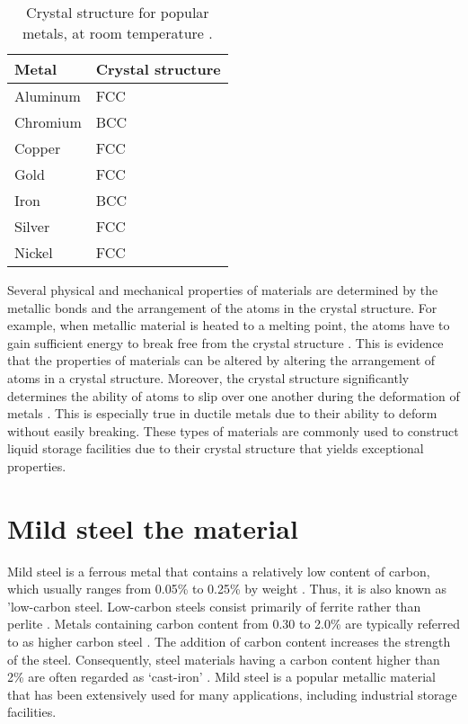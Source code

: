 \begin{table}[H]
\caption{Crystal structure for popular metals, at room temperature \cite{hench2005biomaterials}.}

\begin{tabularx}{.8\textwidth}{ XX }
    \hline
    Metal & Crystal structure \\
    \hline
    Aluminum & FCC \\
    Chromium & BCC \\
    Copper & FCC \\
    Gold & FCC \\
    Iron & BCC \\
    Silver & FCC \\
    Nickel & FCC \\
    \hline
\end{tabularx}

\label{ch3:table:structure}
\end{table}

Several physical and mechanical properties of materials are determined by the metallic bonds and the arrangement of the atoms in the crystal structure. For example, when metallic material is heated to a melting point, the atoms have to gain sufficient energy to break free from the crystal structure \cite{hench2005biomaterials}. This is evidence that the properties of materials can be altered by altering the arrangement of atoms in a crystal structure. Moreover, the crystal structure significantly determines the ability of atoms to slip over one another during the deformation of metals \cite{callister2018materials}. This is especially true in ductile metals due to their ability to deform without easily breaking. These types of materials are commonly used to construct liquid storage facilities due to their crystal structure that yields exceptional properties.

\section{Mild steel the material}
\label{ch3:anchor:section:material}
Mild steel is a ferrous metal that contains a relatively low content of carbon, which usually ranges from 0.05\% to 0.25\% by weight \cite{callister2018materials}. Thus, it is also known as 'low-carbon steel.  Low-carbon steels consist primarily of ferrite rather than perlite \cite{li2018effect}. Metals containing carbon content from 0.30 to 2.0\% are typically referred to as higher carbon steel \cite{timings2008fabrication}. The addition of carbon content increases the strength of the steel. Consequently, steel materials having a carbon content higher than 2\% are often regarded as ‘cast-iron' \cite{callister2018materials}.  Mild steel is a popular metallic material that has been extensively used for many applications, including industrial storage facilities.

